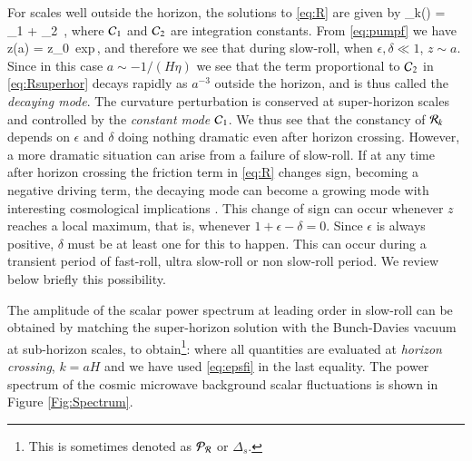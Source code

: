 \ni For scales well outside the horizon, the solutions to \eqref{eq:R} are given by
\be
\label{eq:Rsuperhor}
\cR_k(\eta) = \cC_1 + \cC_2 \int{}\,,
\ee
where $\mathcal{C}_1$ and $\mathcal{C}_2$ are integration constants. From \eqref{eq:pumpf} we have
\be\label{eq:zsol}
z(a) = z_0 \,{\rm exp}\lb {}\rb\,,
\ee
and therefore we see that during slow-roll,  when $\epsilon, \delta\ll 1$, $z\sim a$. Since  in this case $a\sim -1/(H\eta)$ we see that the term proportional to $\mathcal{C}_2$ in \eqref{eq:Rsuperhor} decays rapidly as $a^{-3}$  outside the horizon, and is thus called the {\em decaying mode}. The  curvature perturbation is conserved at super-horizon scales and controlled by the {\em constant mode} $\mathcal{C}_1$.
We thus see that the constancy of ${\cal R}_k$ depends on $\epsilon$ and $\delta$ doing nothing dramatic even after horizon crossing.
However, a more dramatic situation can  arise from a failure of slow-roll. If at any time after horizon crossing the friction term in \eqref{eq:R} changes sign,  becoming a negative driving term, the decaying mode can become a growing mode with interesting cosmological implications \cite{Leach:2000yw,Leach:2001zf,Ozsoy:2018flq}. This change of sign can occur whenever $z$ reaches a local maximum, that is,  whenever $1+\epsilon-\delta=0$. Since $\epsilon$ is always positive, $\delta$ must be at least one for this to happen. This can occur during a transient period of fast-roll, ultra slow-roll  or non slow-roll period. We review below briefly this possibility.

The  amplitude of the scalar power spectrum at leading order in slow-roll can be obtained by matching the super-horizon solution with the Bunch-Davies vacuum at sub-horizon scales, to obtain\footnote{This is sometimes denoted as $\mathcal{P}_{\mathcal{R}}$ or $\Delta_s$.}:
\be
\setlength\fboxsep{0.25cm}
\setlength\fboxrule{0.4pt}
\ee
where all quantities are evaluated at {\em horizon crossing}, $k=aH$ and we have used \eqref{eq:epsfi} in the last equality. The power spectrum of the  cosmic microwave background scalar fluctuations is shown in Figure \ref{Fig:Spectrum}. 

